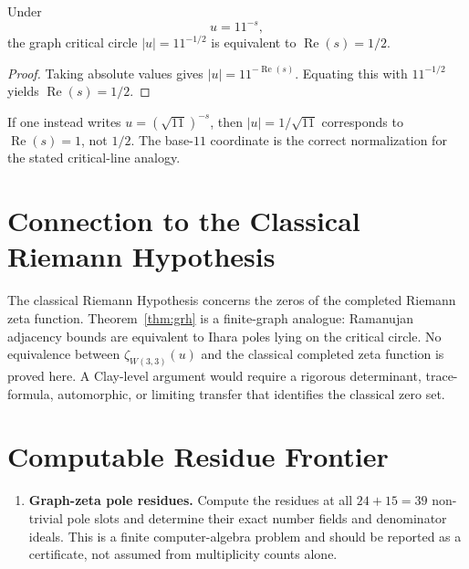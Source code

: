 \begin{proposition}
Under
\begin{equation}
  u=11^{-s},
\end{equation}
the graph critical circle $|u|=11^{-1/2}$ is equivalent to
$\operatorname{Re}(s)=1/2$.
\end{proposition}

\begin{proof}
Taking absolute values gives
$|u|=11^{-\operatorname{Re}(s)}$.  Equating this with $11^{-1/2}$ yields
$\operatorname{Re}(s)=1/2$.
\end{proof}

\begin{remark}
If one instead writes $u=(\sqrt{11})^{-s}$, then
$|u|=1/\sqrt{11}$ corresponds to $\operatorname{Re}(s)=1$, not $1/2$.
The base-$11$ coordinate is the correct normalization for the stated
critical-line analogy.
\end{remark}

\section{Connection to the Classical Riemann Hypothesis}
\label{sec:crh}

\begin{remark}
The classical Riemann Hypothesis concerns the zeros of the completed
Riemann zeta function.  Theorem~\ref{thm:grh} is a finite-graph analogue:
Ramanujan adjacency bounds are equivalent to Ihara poles lying on the
critical circle.  No equivalence between $\zeta_{W(3,3)}(u)$ and the
classical completed zeta function is proved here.  A Clay-level argument
would require a rigorous determinant, trace-formula, automorphic, or
limiting transfer that identifies the classical zero set.
\end{remark}

\section{Computable Residue Frontier}
\label{sec:p18}

\begin{enumerate}[label=\textbf{P\arabic*.},start=18]
  \item \textbf{Graph-zeta pole residues.}
        Compute the residues at all $24+15=39$ non-trivial pole slots and
        determine their exact number fields and denominator ideals.  This
        is a finite computer-algebra problem and should be reported as a
        certificate, not assumed from multiplicity counts alone.
\end{enumerate}
